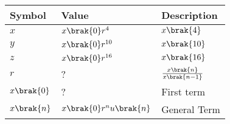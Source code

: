 \begin{tabular}{|m{2cm}|m{2cm}|m{2cm}|}
    \hline
    \textbf{Symbol} & \textbf{Value} & \textbf{Description}\\ [1ex]
    \hline
        $x$ & $x\brak{0}r^4$ & $x\brak{4}$ \\ [1ex]
    \hline
        $y$ & $x\brak{0}r^{10}$ & $x\brak{10}$\\ [1ex]
    \hline
        $z$ & $x\brak{0}r^{16}$ & $x\brak{16}$\\ [1ex]
    \hline
        $r$ & ? & $\frac{x\brak{n}}{x\brak{n-1}}$\\[1ex]
    \hline \vspace{0.1cm}
        $x\brak{0}$ & ? & First term \\[1ex]
    \hline
        $x\brak{n}$ & $x\brak{0}r^nu\brak{n}$ & General Term \\ [1ex]
    \hline
    \end{tabular}
